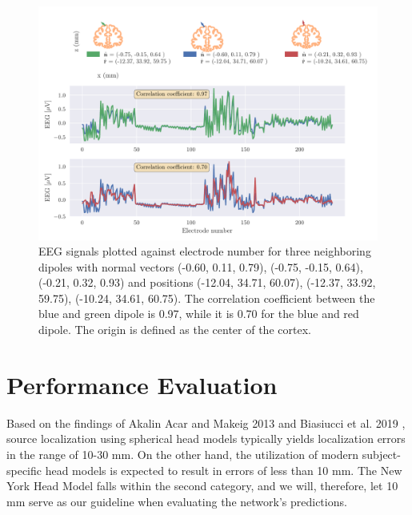 \documentclass[a4paper, UKenglish, 11pt]{uiomaster}
\begin{document}

\begin{figure}[!htb]
    \centering
    \includegraphics[width=\linewidth]{figures/compare_dipoles.pdf}
    \caption{EEG signals plotted against electrode number for three neighboring dipoles with normal vectors (-0.60, 0.11, 0.79), (-0.75, -0.15, 0.64), (-0.21, 0.32, 0.93) and positions (-12.04, 34.71, 60.07), (-12.37, 33.92, 59.75), (-10.24, 34.61, 60.75). The correlation coefficient between the blue and green dipole is 0.97, while it is 0.70 for the blue and red dipole. The origin is defined as the center of the cortex.}
    \label{fig:neighbour_dipoles}
\end{figure}

\FloatBarrier

\section{Performance Evaluation}
Based on the findings of Akalin Acar and Makeig 2013 \cite{akalin2013effects} and Biasiucci et al. 2019 \cite{biasiucci2019electroencephalography}, source localization using spherical head models typically yields localization errors in the range of 10-30 mm. On the other hand, the utilization of modern subject-specific head models is expected to result in errors of less than 10 mm. The New York Head Model falls within the second category, and we will, therefore, let 10 mm serve as our guideline when evaluating the network's predictions.
\end{document}
